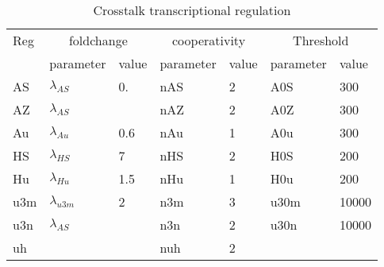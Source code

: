 \documentclass{article}
\begin{document}
\begin{table}[]
\begin{tabular}{l||ll|ll|ll}
Reg &  \multicolumn{2}{|c|}{foldchange}&  \multicolumn{2}{|c|}{cooperativity}&  \multicolumn{2}{|c}{Threshold} \\
& parameter & value& parameter & value& parameter & value\\
\hline
AS &  $\lambda_{AS}$\cite{Chou2014} &  0.&nAS & 2 &  A0S & 300\\
AZ & $\lambda_{AS}$ & & nAZ\cite{Ohshima2019} & 2  & A0Z& 300\\   
Au & $\lambda_{Au}$\cite{Jin2019} &0.6&  nAu\cite{Zhang2019} & 1 & A0u & 300 \\
HS& $\lambda_{HS}$ \cite{Xu2015} & 7  & nHS\cite{Xu2015} & 2& H0S& 200\\
Hu & $\lambda_{Hu}$\cite{Shang2017} &1.5 & nHu & 1& H0u & 200\\
u3m &$\lambda_{u3m}$\cite{Bai2011} & 2  & n3m & 3& u30m & 10000\\
u3n &$\lambda_{AS}$ &  &n3n & 2 &u30n & 10000\\
uh & &&nuh & 2&&\\
\end{tabular}
\label{table:xparams}
\caption{Crosstalk transcriptional regulation}
\end{table}
\end{document}

